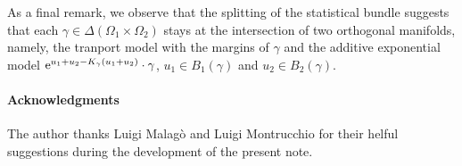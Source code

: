\documentclass[runningheads]{llncs}
\begin{document}
As a final remark, we observe that the splitting of the statistical bundle suggests that each $\gamma \in \Delta(\Omega_1\times\Omega_2)$ stays at the intersection of two orthogonal manifolds, namely, the tranport model with the margins of $\gamma$ and the additive exponential model $\mathrm{e}^{u_1+u_2 - K_\gamma(u_1 + u_2)} \cdot \gamma$, $u_1 \in B_1(\gamma)$ and $u_2 \in B_2(\gamma)$.

\paragraph{Acknowledgments}
The author thanks Luigi Malag\`o and Luigi Montrucchio for their helful suggestions during the development of the present note.





\end{document}
